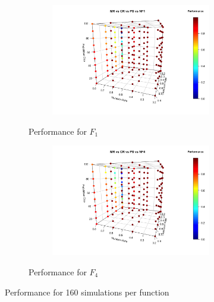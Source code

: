 \documentclass[openany]{article}
\begin{document}
				\begin{figure}[H]
					\centering
					\begin{subfigure}{.5\textwidth}
						\centering
						\begin{center}
							\begin{figure}[H]
								\iftrue
								\includegraphics[scale=0.2]{res/hyperF1}
								\fi
							\end{figure}
						\end{center}
						\caption{Performance for $F_1$}
						\label{fig:sub1}
					\end{subfigure}%
					\begin{subfigure}{.5\textwidth}
						\centering
						\begin{center}
							\begin{figure}[H]
								\iftrue
								\includegraphics[scale=0.2]{res/hyperF4}
								\fi
							\end{figure}
						\end{center}
						\caption{Performance for $F_4$}
						\label{fig:sub2}
					\end{subfigure}
					\caption{Performance for 160 simulations per function}
					\label{fig:test}
				\end{figure}
\end{document}
